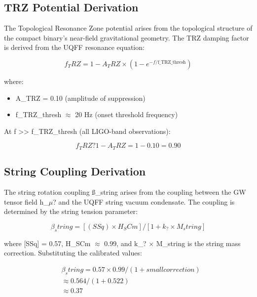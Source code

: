 \documentclass[12pt,a4paper]{article}
\begin{document}
\subsection{TRZ Potential Derivation}

The Topological Resonance Zone potential arises from the topological structure of the compact binary's near-field gravitational geometry. The TRZ damping factor is derived from the UQFF resonance equation:

\begin{equation}
f_TRZ = 1 - A_TRZ \times (1 - e^{-f/\text{f\_TRZ\_thresh}})
\end{equation}

where:

\begin{itemize}
  \item A\_TRZ = 0.10 (amplitude of suppression)
  \item f\_{TRZ\_thresh} $\approx$ 20 Hz (onset threshold frequency)
\end{itemize}

At f >> f\_{TRZ\_thresh} (all LIGO-band observations):

\begin{equation}
f_TRZ ? 1 - A_TRZ = 1 - 0.10 = 0.90
\end{equation}

\subsection{String Coupling Derivation}

The string rotation coupling \ss{}\_string arises from the coupling between the GW tensor field h\_$\mu$? and the UQFF string vacuum condensate. The coupling is determined by the string tension parameter:

\begin{equation}
\beta_string = [(SSq) \times H_SCm] / [1 + k_? \times M_string]
\end{equation}

where [SSq] = 0.57, H\_SCm $\approx$ 0.99, and k\_? $\times$ M\_string is the string mass correction. Substituting the calibrated values:

\begin{equation}
\begin{aligned}
  & \beta_string = 0.57 \times 0.99 / (1 + small correction) \\
  & \approx 0.564 / (1 + 0.522) \\
  & \approx 0.37
\end{aligned}
\end{equation}
\end{document}
